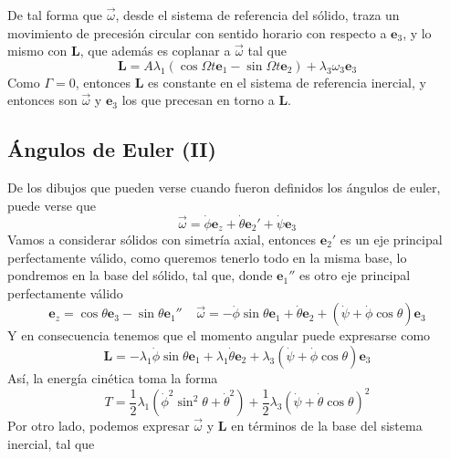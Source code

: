 De tal forma que $\vec{\omega}$, desde el sistema de referencia del sólido, traza un movimiento de precesión circular con sentido horario con respecto a $\mathbf{e}_3$, y lo mismo con $\mathbf{L}$, que además es coplanar a $\vec{\omega}$ tal que
\begin{equation} \label{6.1.1}
    \mathbf{L} = A\lambda_1(\cos\Omega t \mathbf{e}_1 - \sin\Omega t \mathbf{e}_2) + \lambda_3 \omega_3 \mathbf{e}_3
\end{equation}
Como $\mathcal{\Gamma} = 0$, entonces $\mathbf{L}$ es constante en el sistema de referencia inercial, y entonces son $\vec{\omega}$ y $\mathbf{e}_3$ los que precesan en torno a $\mathbf{L}$.
\subsection{Ángulos de Euler (II)}
De los dibujos que pueden verse cuando fueron definidos los ángulos de euler, puede verse que 
\begin{equation} \label{6.1.1}
    \vec{\omega} = \dot{\phi} \mathbf{e}_z + \dot{\theta} \mathbf{e}_2'+\dot{\psi} \mathbf{e}_3
\end{equation}
Vamos a considerar sólidos con simetría axial, entonces $\mathbf{e}_2'$ es un eje principal perfectamente válido, como queremos tenerlo todo en la misma base, lo pondremos en la base del sólido, tal que, donde $\mathbf{e}_1''$ es otro eje principal perfectamente válido
\begin{equation} \label{6.1.1}
    \mathbf{e}_z = \cos\theta \mathbf{e}_3 - \sin\theta \mathbf{e}_1'' \ \ \ \ \ \vec{\omega} = -\dot{\phi}\sin\theta \mathbf{e}_1 + \dot{\theta} \mathbf{e}_2+(\dot{\psi}+\dot{\phi}\cos\theta)\mathbf{e}_3
\end{equation}
Y en consecuencia tenemos que el momento angular puede expresarse como
\begin{equation} \label{6.1.1}
    \mathbf{L} = -\lambda_1\dot{\phi}\sin\theta \mathbf{e}_1 + \lambda_1 \dot{\theta} \mathbf{e}_2+\lambda_3(\dot{\psi}+\dot{\phi}\cos\theta)\mathbf{e}_3
\end{equation}
Así, la energía cinética toma la forma
\begin{equation} \label{6.1.1}
    T = \frac{1}{2}\lambda_1\left(\dot{\phi}^2\sin^2\theta+ \dot{\theta}^2\right)+\frac{1}{2}\lambda_3\left(\dot{\psi}+\dot{\theta}\cos\theta\right)^2
\end{equation}
Por otro lado, podemos expresar $\vec{\omega}$ y $\mathbf{L}$ en términos de la base del sistema inercial, tal que

